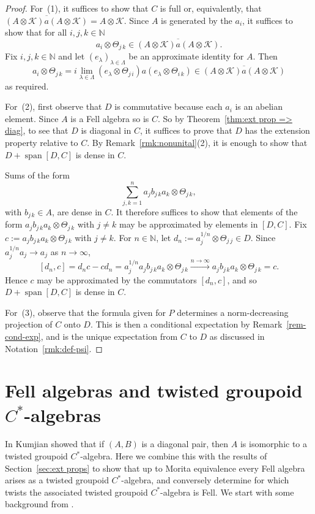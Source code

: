 \documentclass[12pt,a4paper]{amsart}
\newcommand{\field}[1]{\mathbb{#1}}
\newcommand{\NN}{\field{N}}
\newcommand{\Kk}{\mathcal{K}}
\newcommand{\lsp}{\operatorname{span}}
\begin{document}
\begin{proof} For~(1), it suffices to show that
$C$ is full  or, equivalently, that $\overline{(A \otimes \Kk) a (A \otimes \Kk)} = A \otimes \Kk$.
Since $A$ is generated by the $a_i$, it suffices to show that for all $i, j,k \in \NN$
\[
a_i \otimes \Theta_{j\,k} \in \overline{(A \otimes \Kk) a
(A \otimes \Kk)}.
\]
Fix $i,j,k \in \NN$ and let $(e_\lambda)_{\lambda \in
\Lambda}$ be an approximate identity for $A$. Then
\[
a_i \otimes \Theta_{j\,k}
    =i \lim_{\lambda \in \Lambda} (e_\lambda \otimes \Theta_{j\,i})
                                    a (e_\lambda \otimes \Theta_{i\,k})
    \in \overline{(A \otimes \Kk) a (A \otimes \Kk)}
\]
as required.

For~(2), first observe that $D$ is commutative because each
$a_i$ is an abelian element.  Since $A$ is a Fell algebra so is
$C$. So by Theorem~\ref{thm:ext prop => diag}, to see that $D$
is diagonal in $C$, it suffices to prove that $D$ has the
extension property relative to $C$. By
Remark~\ref{rmk:nonunital}(2), it is enough to show that $D +
\lsp[D, C]$ is dense in $C$.

Sums of the form
\[
\sum_{j,k = 1}^n a_j b_{j\,k} a_k \otimes\Theta_{j\,k},
\]
with $b_{j\,k} \in A$, are dense in $C$. It therefore suffices
to show that elements of the form $a_j b_{j\,k} a_k \otimes
\Theta_{j\,k}$ with $j \ne k$ may be approximated by elements in
$[D,C]$.  Fix $c := a_j b_{j\,k} a_k \otimes \Theta_{j\,k}$ with
$j \ne k$.  For $n \in \NN$, let $d_n := a_j^{1/n} \otimes
\Theta_{j\,j} \in D$. Since $a_j^{1/n}a_j \to a_j$ as $n \to
\infty$,
\[
[d_n, c] = d_n c - cd_n  = a_j^{1/n}a_j b_{j\,k} a_k \otimes \Theta_{j\,k}
            \xrightarrow{n \to \infty} a_j b_{j\,k} a_k \otimes \Theta_{j\,k} = c.
\]
Hence $c$ may be approximated by the commutators $[d_n, c]$,
and so $D + \lsp[D, C]$ is dense in $C$.

For~(3), observe that the formula given for $P$ determines a
norm-decreasing projection of $C$ onto $D$. This is then a
conditional expectation by Remark~\ref{rem-cond-exp}, and is the
unique expectation from $C$ to $D$ as discussed in
Notation~\ref{rmk:def-psi}.
\end{proof}


\section{Fell algebras and twisted groupoid \texorpdfstring{$C^*$}{C*}-algebras}\label{sec:TypeI0 and diagonals}

In \cite[Theorem~3.1]{Kumjian1986} Kumjian showed that if
$(A,B)$ is a diagonal pair, then $A$ is isomorphic to a
twisted groupoid $C^*$-algebra. Here we combine this with the results
of Section~\ref{sec:ext props} to show that up to Morita
equivalence every Fell algebra arises as a twisted groupoid
$C^*$-algebra, and conversely determine for which twists the
associated twisted groupoid $C^*$-algebra is Fell. We start
with some background from \cite[\S2]{Kumjian1986}.
\end{document}
